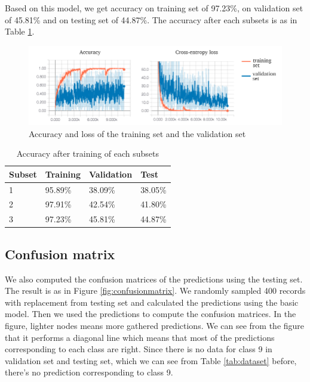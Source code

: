 \documentclass{article}
\begin{document}
\noindent Based on this model, we get accuracy on training set of 97.23\%, on validation set of 45.81\% and on testing set of 44.87\%. The accuracy after each subsets is as in Table \ref{tab:accuracy_loss_200_apart}.

\begin{figure}[h!]
\centering
\includegraphics[width=\textwidth]{accuracy_loss_200_apart.png}
\caption{Accuracy and loss of the training set and the validation set}
\label{fig:accuracy_loss_200_apart}
\end{figure}

\begin{table}[t]
  \caption{Accuracy after training of each subsets}
  \label{tab:accuracy_loss_200_apart}
  \centering
  \begin{tabular}{llll}
    \toprule
    Subset  &Training	& Validation	& Test\\
    \midrule
    1 & 95.89\%	& 38.09\%	& 38.05\%\\
    2 & 97.91\%	& 42.54\%	& 41.80\%\\
    3 & 97.23\%	& 45.81\%	& 44.87\%\\
    \bottomrule
  \end{tabular}
\end{table}

\subsection{Confusion matrix}

We also computed the confusion matrices of the predictions using the testing set. The result is as in Figure \ref{fig:confusionmatrix}. We randomly sampled 400 records with replacement from testing set and calculated the predictions using the basic model. Then we used the predictions to compute the confusion matrices. In the figure, lighter nodes means more gathered predictions. We can see from the figure that it performs a diagonal line which means that most of the predictions corresponding to each class are right. Since there is no data for class 9 in validation set and testing set, which we can see from Table \ref{tab:dataset} before, there's no prediction corresponding to class 9.
\end{document}
